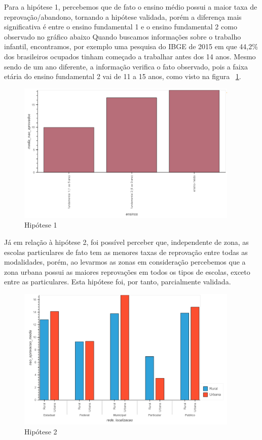 \documentclass[review]{elsarticle}
\begin{document}
Para a hipótese 1, percebemos que de fato o ensino médio possui a maior taxa de reprovação/abandono, tornando a hipótese validada, porém a diferença mais significativa é entre o ensino fundamental 1 e o ensino fundamental 2 como observado no gráfico abaixo Quando buscamos informações sobre o trabalho infantil, encontramos, por exemplo uma pesquisa do IBGE de 2015 \cite{OGLOBO16} em que 44,2\% dos brasileiros ocupados tinham começado a trabalhar antes dos 14 anos. Mesmo sendo de um ano diferente, a informação verifica o fato observado, pois a faixa etária do ensino fundamental 2 vai de 11 a 15 anos, como visto na figura ~\ref{fig:h1}.\par
\begin{figure}[h!]
\includegraphics[width=300pt]{h1_graph.png}
\caption{Hipótese 1}
\label{fig:h1}
\centering
\end{figure}
Já em relação à hipótese 2, foi possível perceber que, independente de zona, as escolas particulares de fato tem as menores taxas de reprovação entre todas as modalidades, porém, ao levarmos as zonas em consideração percebemos que a zona urbana possui as maiores reprovações em todos os tipos de escolas, exceto entre as particulares. Esta hipótese foi, por tanto, parcialmente validada.\par
\begin{figure}[h!]
\includegraphics[width=300pt]{h2_graph.png}
\caption{Hipótese 2}
\label{fig:h2}
\centering
\end{figure}
\end{document}
